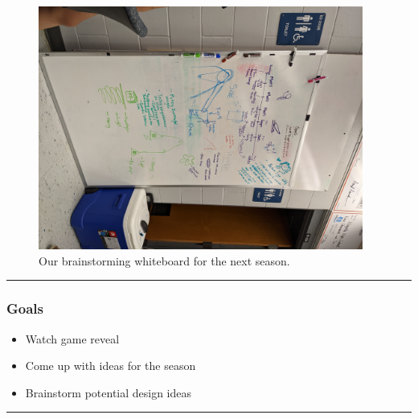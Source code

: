 \begin{figure}[ht]
\begin{minipage}[b]{.48\textwidth}
  \includegraphics[width=0.95\textwidth]{Meetings/September/09-18-21/PXL_20210918_184637754 - Jensen Miller.jpg}
  \caption{Our brainstorming whiteboard for the next season.}
  \label{fig:pic2}
\end{minipage}
\end{figure}

\noindent\hfil\rule{\textwidth}{.4pt}\hfil
\subsubsection*{Goals}
\begin{itemize}
    \item Watch game reveal
		\item Come up with ideas for the season
		\item Brainstorm potential design ideas

\end{itemize} 

\noindent\hfil\rule{\textwidth}{.4pt}\hfil

